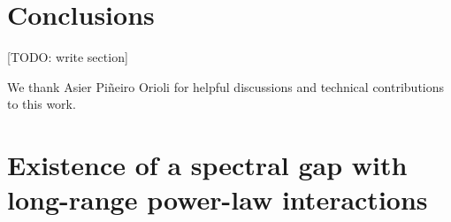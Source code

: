 \documentclass[nofootinbib,notitlepage,11pt]{revtex4-2}
\newcommand{\1}{\mathds{1}}
\newcommand{\red}[1]{{\color{red} #1}}
\begin{document}

\newpage

\section{Conclusions}
\label{sec:conclusions}


\red{[TODO: write section]}


\begin{acknowledgments}
  We thank Asier Pi\~neiro Orioli for helpful discussions and
  technical contributions to this work.
\end{acknowledgments}



\newpage
\appendix

\section{Existence of a spectral gap with long-range power-law
  interactions}
\label{sec:spectral_gap}
\end{document}

